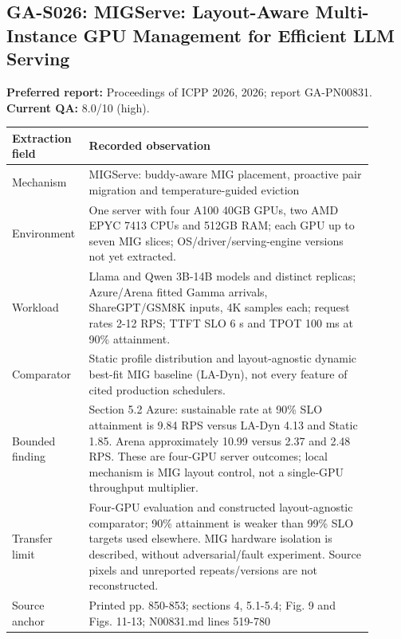 \subsection{GA-S026: MIGServe: Layout-Aware Multi-Instance GPU Management for Efficient LLM Serving}
\textbf{Preferred report:} Proceedings of ICPP 2026, 2026; report GA-PN00831. \textbf{Current QA:} 8.0/10 (high).
\begin{longtable}{P{0.15\linewidth}P{0.75\linewidth}}
\toprule Extraction field & Recorded observation\\\midrule\endhead
Mechanism & MIGServe: buddy-aware MIG placement, proactive pair migration and temperature-guided eviction\\
Environment & One server with four A100 40GB GPUs, two AMD EPYC 7413 CPUs and 512GB RAM; each GPU up to seven MIG slices; OS/driver/serving-engine versions not yet extracted.\\
Workload & Llama and Qwen 3B-14B models and distinct replicas; Azure/Arena fitted Gamma arrivals, ShareGPT/GSM8K inputs, 4K samples each; request rates 2-12 RPS; TTFT SLO 6 s and TPOT 100 ms at 90\% attainment.\\
Comparator & Static profile distribution and layout-agnostic dynamic best-fit MIG baseline (LA-Dyn), not every feature of cited production schedulers.\\
Bounded finding & Section 5.2 Azure: sustainable rate at 90\% SLO attainment is 9.84 RPS versus LA-Dyn 4.13 and Static 1.85. Arena approximately 10.99 versus 2.37 and 2.48 RPS. These are four-GPU server outcomes; local mechanism is MIG layout control, not a single-GPU throughput multiplier.\\
Transfer limit & Four-GPU evaluation and constructed layout-agnostic comparator; 90\% attainment is weaker than 99\% SLO targets used elsewhere. MIG hardware isolation is described, without adversarial/fault experiment. Source pixels and unreported repeats/versions are not reconstructed.\\
Source anchor & Printed pp. 850-853; sections 4, 5.1-5.4; Fig. 9 and Figs. 11-13; N00831.md lines 519-780\\
\bottomrule\end{longtable}

